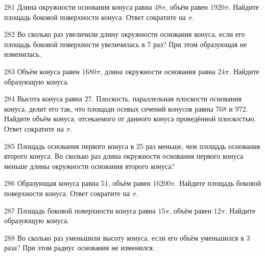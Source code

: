 \documentclass[a4paper]{article}
\begin{document}
\begin{taskBN}{281}
Длина окружности основания конуса равна $48\pi$, объём равен $1920\pi$. Найдите площадь боковой поверхности конуса. Ответ сократите на $\pi$.
\end{taskBN}

\begin{taskBN}{282}
Во сколько раз увеличили длину окружности основания конуса, если его площадь боковой поверхности увеличилась в 7 раз? При этом образующая не изменилась.
\end{taskBN}

\begin{taskBN}{283}
Объём конуса равен $1680\pi$, длина окружности основания равна $24\pi$. Найдите образующую конуса. 
\end{taskBN}

\begin{taskBN}{284}
Высота конуса равна $27$. Плоскость, параллельная плоскости основания конуса,  делит его так, что площади осевых сечений конусов равны $768$ и $972$. Найдите объём конуса, отсекаемого от данного конуса проведённой плоскостью. Ответ сократите на $\pi$.
\end{taskBN}

\begin{taskBN}{285}
Площадь основания первого конуса в 25 раз меньше, чем площадь основания второго конуса. Во сколько раз длина окружности основания первого конуса меньше длины окружности основания второго конуса?
\end{taskBN}

\begin{taskBN}{286}
Образующая конуса равна $51$, объём равен $16200\pi$. Найдите площадь боковой поверхности конуса. Ответ сократите на $\pi$.
\end{taskBN}

\begin{taskBN}{287}
Площадь боковой поверхности конуса равна $15\pi$, объём равен $12\pi$. Найдите образующую конуса. 
\end{taskBN}

\begin{taskBN}{288}
Во сколько раз уменьшили высоту конуса, если его объём уменьшился в 3 раза? При этом радиус основания не изменился.
\end{taskBN}
\end{document}
